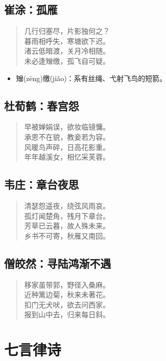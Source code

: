 \documentclass[12pt,oneside]{book}
\newenvironment{shici}{
\begin{verse}
\centering\large\hspace{12pt}}
{\end{verse}}
\begin{document}
\chapter{崔涂：孤雁}
\begin{shici}
几行归塞尽，片影独何之？\\
暮雨相呼失，寒塘欲下迟。\\
渚云低暗渡，关月冷相随。\\
未必逢矰缴，孤飞自可疑。
\end{shici}

\begin{itemize}
\item 矰(zēng)缴(jiǎo)：系有丝绳、弋射飞鸟的短箭。
\end{itemize}

\chapter{杜荀鹤：春宫怨}
\begin{shici}
早被婵娟误，欲妆临镜慵。\\
承恩不在貌，教妾若为容。\\
风暖鸟声碎，日高花影重。\\
年年越溪女，相忆采芙蓉。
\end{shici}

\chapter{韦庄：章台夜思}
\begin{shici}
清瑟怨遥夜，绕弦风雨哀。\\
孤灯闻楚角，残月下章台。\\
芳草已云暮，故人殊未来。\\
乡书不可寄，秋雁又南回。
\end{shici}

\chapter{僧皎然：寻陆鸿渐不遇}
\begin{shici}
移家虽带郭，野径入桑麻。\\
近种篱边菊，秋来未著花。\\
扣门无犬吠，欲去问西家。\\
报到山中去，归来每日斜。
\end{shici}


\part{七言律诗}
\end{document}
